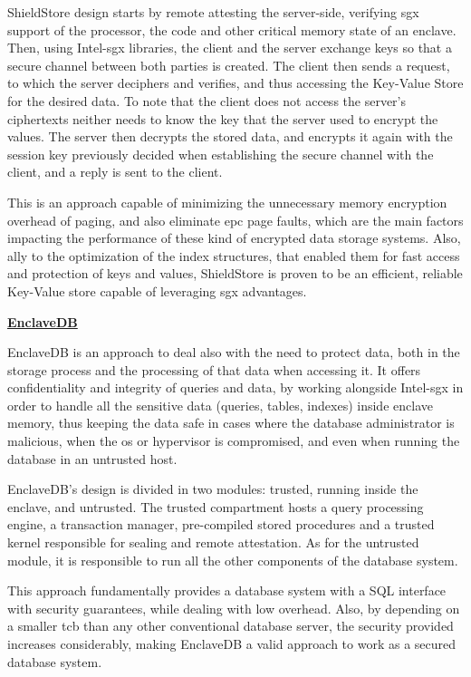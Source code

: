ShieldStore design starts by remote attesting the server-side, verifying \gls{sgx} support of the processor, the code and other critical memory state of an enclave. Then, using Intel-\gls{sgx} libraries, the client and the server exchange keys so that a secure channel between both parties is created. The client then sends a request, to which the server deciphers and verifies, and thus accessing the Key-Value Store for the desired data. To note that the client does not access the server's ciphertexts neither needs to know the key that the server used to encrypt the values. The server then decrypts the stored data, and encrypts it again with the session key previously decided when establishing the secure channel with the client, and a reply is sent to the client.    

This is an approach capable of minimizing the unnecessary memory encryption overhead of paging, and also eliminate \gls{epc} page faults, which are the main factors impacting the performance of these kind of encrypted data storage systems. Also, ally to the optimization of the index structures, that enabled them for fast access and protection of keys and values, ShieldStore is proven to be an efficient, reliable Key-Value store capable of leveraging \gls{sgx} advantages.\newline


\underline{\textbf{EnclaveDB}}

EnclaveDB \cite{enclavedbPaper} is an approach to deal also with the need to protect data, both in the storage process and the processing of that data when accessing it. It offers confidentiality and integrity of queries and data, by working alongside Intel-\gls{sgx} in order to handle all the sensitive data (queries, tables, indexes) inside enclave memory, thus keeping the data safe in cases where the database administrator is malicious, when the \gls{os} or hypervisor is compromised, and even when running the database in an untrusted host. 

EnclaveDB's design is divided in two modules: trusted, running inside the enclave, and untrusted. The trusted compartment hosts a query processing engine, a transaction manager, pre-compiled stored procedures and a trusted kernel responsible for sealing and remote attestation. As for the untrusted module, it is responsible to run all the other components of the database system. 

This approach fundamentally provides a database system with a SQL interface with security guarantees, while dealing with low overhead. Also, by depending on a smaller \gls{tcb} than any other conventional database server, the security provided increases considerably, making EnclaveDB a valid approach to work as a secured database system.




